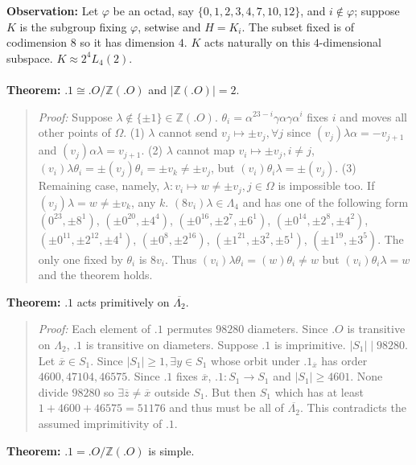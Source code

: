 {\bf Observation:}
Let $\varphi$ be an octad, say $\{ 0,1,2,3,4,7,10,12 \}$,
and $i \notin \varphi$; suppose $K$ is the subgroup fixing $\varphi$,
setwise and $H= K_i$.  The subset fixed is of codimension $8$ so it has dimension $4$.  $K$
acts naturally on this $4$-dimensional subspace.  $K \approx 2^4 L_4(2)$.
\\
\\
{\bf Theorem:} 
$.1 \cong .O/{\mathbb Z}(.O)$ and
$|{\mathbb Z}(.O)|= 2$.
\begin{quote}
\emph{Proof:} 
Suppose $\lambda \notin \{\pm1\} \in {\mathbb Z}(.O)$.
$\theta_i= \alpha^{23-i} \gamma \alpha  \gamma \alpha^i $ fixes $i$ and moves all other
points of $\Omega$.  
(1) $\lambda$ cannot send $v_j \mapsto \pm v_j, \forall j$ since
$(v_j)\lambda \alpha = - v_{j+1}$ and
$(v_j)\alpha \lambda= v_{j+1}$.  
(2) $\lambda$ cannot map $v_i \mapsto \pm v_j, i \ne j$, 
$(v_i) \lambda \theta_i= \pm (v_j) \theta_i= \pm v_k \ne \pm  v_j$, but
$(v_i) \theta_i \lambda= \pm (v_j)$.
(3) Remaining case, namely, $\lambda: v_i \mapsto w \ne \pm v_j, j \in \Omega$ is impossible too.
If $(v_j)\lambda = w \ne \pm v_k$, any $k$.  $(8v_i)\lambda \in \Lambda_4$ and has one of the following
form $(0^{23},\pm 8^{1})$, $(\pm 0^{20},\pm 4^{4})$, $(\pm 0^{16},\pm 2^{7}, \pm 6^{1})$,
$(\pm 0^{14},\pm 2^{8}, \pm 4^{2})$, $(\pm 0^{11},\pm 2^{12}, \pm 4^{1})$, $(\pm 0^{8},\pm 2^{16})$,
$(\pm 1^{21},\pm 3^{2}, \pm 5^{1})$, $(\pm 1^{19},\pm 3^{5})$.  The only one fixed by $\theta_i$ is
$8v_i$.  Thus
$(v_i) \lambda \theta_i = (w)\theta_i \ne w$ but
$(v_i) \theta_i \lambda= w$ and the theorem holds.
\end{quote}
{\bf Theorem:}
$.1$ acts primitively on ${\overline {\Lambda_2}}$.
\begin{quote}
\emph{Proof:} 
Each element of $.1$ permutes $98280$ diameters.  Since $.O$ is transitive on
$\Lambda_2$, $.1$ is transitive on diameters.  Suppose
$.1$ is imprimitive.  $|S_1| \mid 98280$.  Let ${\overline x} \in S_1$.
Since $|S_1| \ge 1, \exists y \in S_1$ whose orbit under $.1_{\overline x}$
has order $4600, 47104, 46575$.  Since $.1$ fixes ${\overline x}$,
$.1: S_1 \rightarrow S_1$ and $|S_1| \ge 4601$.  None divide
$98280$ so $\exists {\overline z} \ne {\overline x}$ outside $S_1$.
But then $S_1$ which has at least $1+4600+46575=51176$ and thus must be all of
${\overline {\Lambda_2}}$.  This contradicts the assumed imprimitivity of $.1$.
\end{quote}
{\bf Theorem:}
$.1= .O/{\mathbb Z}(.O)$ is simple.
